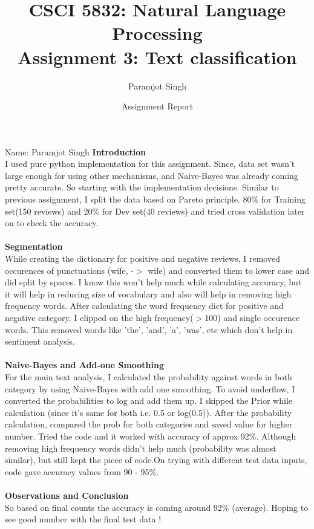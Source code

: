 \documentclass[addpoints,12pt]{exam}
\title{CSCI 5832: Natural Language Processing\\Assignment 3: Text classification}
\date{Assignment Report}
\author{Paramjot Singh}
\begin{document}
\maketitle

\pagestyle{headandfoot}
\runningheadrule
{}
              {}
              {Name: Paramjot Singh}
              \firstpagefooter{}{}{}
              \runningfooter{}{}{}
\textbf{Introduction}\\
I used pure python implementation for this assignment. Since, data set wasn't large enough for using other mechanisms, and Naive-Bayes was already coming pretty accurate. 
So starting with the implementation decisions. Similar to previous assignment, I split the data based on Pareto principle. 80\% for Training set(150 reviews) and 20\% for Dev set(40 reviews) and tried cross validation later on to check the accuracy.
\\ \\
\textbf{Segmentation}\\
While creating the dictionary for positive and negative reviews, I removed occurences of punctuations (wife, -$>$ wife) and converted them to lower case and did split by spaces. I know this won't help much while calculating accuracy, but it will help in reducing size of vocabulary and also will help in removing high frequency words.
After calculating the word frequency dict for positive and negative category. I clipped on the high frequency($>$100) and single occurence words. This removed words like 'the', 'and', 'a', 'was', etc which don't help in sentiment analysis.\\ \\
\textbf{Naive-Bayes and Add-one Smoothing}\\
For the main text analysis, I calculated the probability against words in both category by using Naive-Bayes with add one smoothing. To avoid underflow, I converted the probabilities to log and add them up. I skipped the Prior while calculation (since it's same for both i.e. 0.5 or log(0.5)). After the probability calculation, compared the prob for both categories and saved value for higher number. 
Tried the code and it worked with accuracy of approx 92\%. Although removing high frequency words didn't help much (probability was almost similar), but still kept the piece of code.On trying with different test data inputs, code gave accuracy values from 90 - 95\%.\\ \\
\textbf{Observations and Conclusion}\\
So based on final counts the accuracy is coming around 92\% (average).
Hoping to see good number with the final test data !
\end{document}
